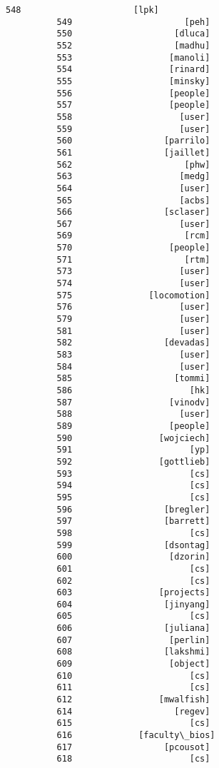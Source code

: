 \documentclass[11pt]{article}
\begin{document}
\begin{Verbatim}[commandchars=\\\{\}]
          548                      [lpk]
          549                      [peh]
          550                    [dluca]
          552                    [madhu]
          553                   [manoli]
          554                   [rinard]
          555                   [minsky]
          556                   [people]
          557                   [people]
          558                     [user]
          559                     [user]
          560                  [parrilo]
          561                  [jaillet]
          562                      [phw]
          563                     [medg]
          564                     [user]
          565                     [acbs]
          566                  [sclaser]
          567                     [user]
          569                      [rcm]
          570                   [people]
          571                      [rtm]
          573                     [user]
          574                     [user]
          575               [locomotion]
          576                     [user]
          579                     [user]
          581                     [user]
          582                  [devadas]
          583                     [user]
          584                     [user]
          585                    [tommi]
          586                       [hk]
          587                   [vinodv]
          588                     [user]
          589                   [people]
          590                 [wojciech]
          591                       [yp]
          592                 [gottlieb]
          593                       [cs]
          594                       [cs]
          595                       [cs]
          596                  [bregler]
          597                  [barrett]
          598                       [cs]
          599                  [dsontag]
          600                   [dzorin]
          601                       [cs]
          602                       [cs]
          603                 [projects]
          604                  [jinyang]
          605                       [cs]
          606                  [juliana]
          607                   [perlin]
          608                  [lakshmi]
          609                   [object]
          610                       [cs]
          611                       [cs]
          612                 [mwalfish]
          614                    [regev]
          615                       [cs]
          616             [faculty\_bios]
          617                  [pcousot]
          618                       [cs]

\end{Verbatim}
\end{document}
